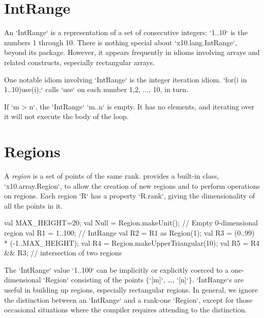 \section{IntRange}
\label{sect:intrange}

An \xcd`IntRange` is a representation of a set of consecutive integers: 
\xcd`1..10` is the numbers 1 through 10.  There is nothing special about
\xcd`x10.lang.IntRange`, beyond its package.  However, it appears frequently
in idioms involving arrays and related constructs, especially rectangular
arrays.

One notable idiom involving \xcd`IntRange` is the integer iteration idiom.  
\xcd`for(i in 1..10)use(i);` calls 
\xcd`use` on each number 1,2, ..., 10, in turn.

If \xcd`m > n`, the \xcd`IntRange` \xcd`m..n` is empty.  It has no elements,
and iterating over it will not execute the body of the loop.

\section{Regions}\label{XtenRegions}

A {\em region} is a set of points of the same rank.  {}\Xten{}
provides a built-in class, \xcd`x10.array.Region`, to allow the
creation of new regions and to perform operations on regions. 
Each region \xcd`R` has a property \xcd`R.rank`, giving the dimensionality of
all the points in it.

\begin{ex}
\begin{xten}
val MAX_HEIGHT=20;
val Null = Region.makeUnit();  // Empty 0-dimensional region
val R1 = 1..100; // IntRange 
val R2 = R1 as Region(1);
val R3 = (0..99) * (-1..MAX_HEIGHT);
val R4 = Region.makeUpperTriangular(10);
val R5 = R4 && R3; // intersection of two regions
\end{xten}

The \xcd`IntRange` value \xcd`1..100` can be implicitly or explicitly coerced
to a one-dimensional \xcd`Region` consisting of the points
$\{$\xcdmath`[m]`, \dots, \xcdmath`[n]`$\}$.  \xcd`IntRange`s are useful in
building up regions, especially rectangular regions.  
In general, we ignore the distinction between an \xcd`IntRange` and a rank-one
\xcd`Region`, except for those occasional situations where the compiler
requires attending to the distinction.
\end{ex}

